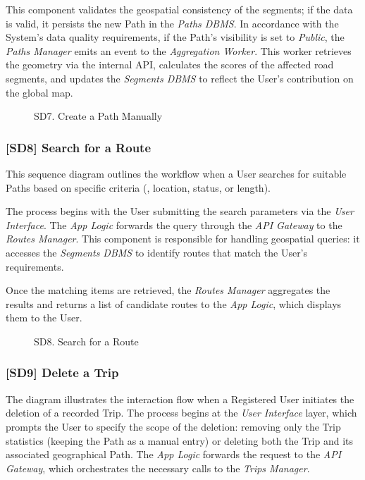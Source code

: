 This component validates the geospatial consistency of the segments; if the data is valid, it persists the new Path in the \emph{Paths DBMS}. In accordance with the System's data quality requirements, if the Path's visibility is set to \emph{Public}, the \emph{Paths Manager} emits an event to the \emph{Aggregation Worker}. This worker retrieves the geometry via the internal API, calculates the scores of the affected road segments, and updates the \emph{Segments DBMS} to reflect the User's contribution on the global map.
\vspace{1cm}
\begin{figure}[H]
    \centering
    
    \caption{SD7. Create a Path Manually}
    \label{fig:SD7}
\end{figure}

\newpage
\subsubsection*{[SD8] Search for a Route}
This sequence diagram outlines the workflow when a User searches for suitable Paths based on specific criteria (\eg, location, status, or length).

The process begins with the User submitting the search parameters via the \emph{User Interface}. The \emph{App Logic} forwards the query through the \emph{API Gateway} to the \emph{Routes Manager}. This component is responsible for handling geospatial queries: it accesses the \emph{Segments DBMS} to identify routes that match the User's requirements.

Once the matching items are retrieved, the \emph{Routes Manager} aggregates the results and returns a list of candidate routes to the \emph{App Logic}, which displays them to the User.
\vspace{1cm}

\begin{figure}[H]
    \centering
    
    \caption{SD8. Search for a Route}
    \label{fig:SD8}
\end{figure}

\newpage
\subsubsection*{[SD9] Delete a Trip}
The diagram illustrates the interaction flow when a Registered User initiates the deletion of a recorded Trip. The process begins at the \emph{User Interface} layer, which prompts the User to specify the scope of the deletion: removing only the Trip statistics (keeping the Path as a manual entry) or deleting both the Trip and its associated geographical Path. The \emph{App Logic} forwards the request to the \emph{API Gateway}, which orchestrates the necessary calls to the \emph{Trips Manager}.



